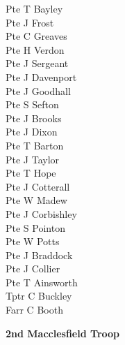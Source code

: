 \begin{multicols}{2}
  Pte T Bayley \\
  Pte J Frost \\
  Pte C Greaves \\
  Pte H Verdon \\
  Pte J Sergeant \\
  Pte J Davenport \\
  Pte J Goodhall \\
  Pte S Sefton \\
  Pte J Brooks \\
  Pte J Dixon \\
  Pte T Barton \\
  Pte J Taylor \\
  Pte T Hope \\
  Pte J Cotterall \\
  Pte W Madew \\
  Pte J Corbishley \\
  Pte S Pointon \\
  Pte W Potts \\
  Pte J Braddock \\
  Pte J Collier \\
  Pte T Ainsworth \\
  Tptr C Buckley \\
  Farr C Booth \\
\end{multicols}

\begin{center}
  \Large
  \textbf{2nd Macclesfield Troop}
\end{center}

